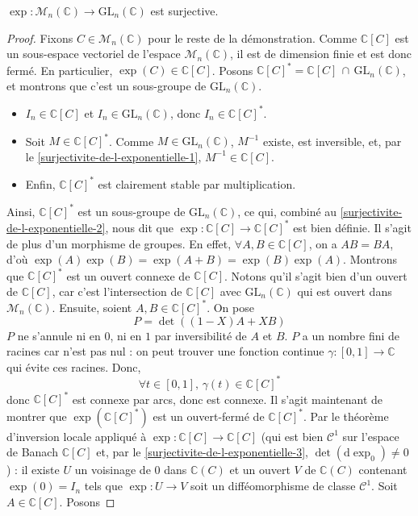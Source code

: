 	\begin{theorem}
		\label{surjectivite-de-l-exponentielle-4}
		$\exp : \mathcal{M}_n(\mathbb{C}) \rightarrow \mathrm{GL}_n(\mathbb{C})$ est surjective.
	\end{theorem}
	
	\begin{proof}
		Fixons $C \in \mathcal{M}_n(\mathbb{C})$ pour le reste de la démonstration. Comme $\mathbb{C}[C]$ est un sous-espace vectoriel de l'espace $\mathcal{M}_n(\mathbb{C})$, il est de dimension finie et est donc fermé. En particulier, $\exp(C) \in \mathbb{C}[C]$.
		\newpar
		Posons $\mathbb{C}[C]^* = \mathbb{C}[C] \, \cap \, \mathrm{GL}_n(\mathbb{C})$, et montrons que c'est un sous-groupe de $\mathrm{GL}_n(\mathbb{C})$.
		\begin{itemize}
			\item $I_n \in \mathbb{C}[C]$ et $I_n \in \mathrm{GL}_n(\mathbb{C})$, donc $I_n \in \mathbb{C}[C]^*$.
			\item Soit $M \in \mathbb{C}[C]^*$. Comme $M \in \mathrm{GL}_n(\mathbb{C})$, $M^{-1}$ existe, est inversible, et, par le \cref{surjectivite-de-l-exponentielle-1}, $M^{-1} \in \mathbb{C}[C]$.
			\item Enfin, $\mathbb{C}[C]^*$ est clairement stable par multiplication.
		\end{itemize}
		Ainsi, $\mathbb{C}[C]^*$ est un sous-groupe de $\mathrm{GL}_n(\mathbb{C})$, ce qui, combiné au \cref{surjectivite-de-l-exponentielle-2}, nous dit que $\exp : \mathbb{C}[C] \rightarrow \mathbb{C}[C]^*$ est bien définie. Il s'agit de plus d'un morphisme de groupes. En effet, $\forall A, B \in \mathbb{C}[C]$, on a $AB=BA$, d'où $\exp(A)\exp(B) = \exp(A+B) = \exp(B)\exp(A)$.
		\newpar
		Montrons que $\mathbb{C}[C]^*$ est un ouvert connexe de $\mathbb{C}[C]$. Notons qu'il s'agit bien d'un ouvert de $\mathbb{C}[C]$, car c'est l'intersection de $\mathbb{C}[C]$ avec $\mathrm{GL}_n(\mathbb{C})$ qui est ouvert dans $\mathcal{M}_n(\mathbb{C})$. Ensuite, soient $A, B \in \mathbb{C}[C]^*$. On pose
		\[ P = \det((1-X)A+XB) \]
		$P$ ne s'annule ni en $0$, ni en $1$ par inversibilité de $A$ et $B$. $P$ a un nombre fini de racines car n'est pas nul : on peut trouver une fonction continue $\gamma : [0,1] \rightarrow \mathbb{C}$ qui évite ces racines. Donc,
		\[ \forall t \in [0,1], \, \gamma(t) \in \mathbb{C}[C]^* \]
		donc $\mathbb{C}[C]^*$ est connexe par arcs, donc est connexe.
		\newpar
		Il s'agit maintenant de montrer que $\exp(\mathbb{C}[C]^*)$ est un ouvert-fermé de $\mathbb{C}[C]^*$. Par le théorème d'inversion locale appliqué à $\exp : \mathbb{C}[C] \rightarrow \mathbb{C}[C]$ (qui est bien $\mathcal{C}^1$ sur l'espace de Banach $\mathbb{C}[C]$ et, par le \cref{surjectivite-de-l-exponentielle-3}, $\det(\mathrm{d}\exp_0) \neq 0$) : il existe $U$ un voisinage de $0$ dans $\mathbb{C}(C)$ et un ouvert $V$ de $\mathbb{C}(C)$ contenant $\exp(0) = I_n$ tels que $\exp : U \rightarrow V$ soit un difféomorphisme de classe $\mathcal{C}^1$. Soit $A \in \mathbb{C}[C]$. Posons

\end{proof}
